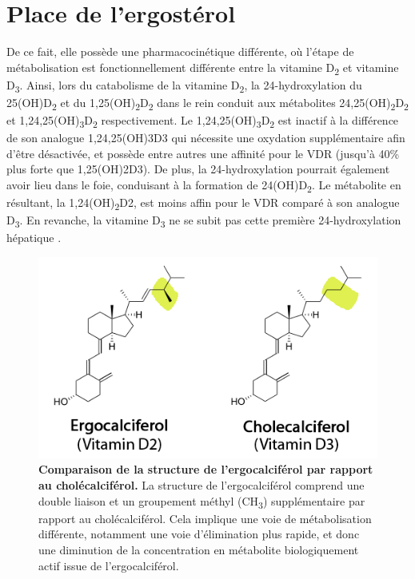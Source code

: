 \documentclass[
  a4paper,
  DIV=11,
  numbers=noendperiod,
  listof=totoc]{scrreprt}
\begin{document}
\hypertarget{place-de-lergostuxe9rol}{%
\section{Place de l'ergostérol}\label{place-de-lergostuxe9rol}}

De ce fait, elle possède une pharmacocinétique différente, où l'étape de
métabolisation est fonctionnellement différente entre la vitamine
D\textsubscript{2} et vitamine D\textsubscript{3}. Ainsi, lors du
catabolisme de la vitamine D\textsubscript{2}, la 24-hydroxylation du
25(OH)D\textsubscript{2} et du
1,25(OH)\textsubscript{2}D\textsubscript{2} dans le rein conduit aux
métabolites 24,25(OH)\textsubscript{2}D\textsubscript{2} et
1,24,25(OH)\textsubscript{3}D\textsubscript{2} respectivement. Le
1,24,25(OH)\textsubscript{3}D\textsubscript{2} est inactif à la
différence de son analogue \ac{1,24,25(OH)3D3} qui nécessite une
oxydation supplémentaire afin d'être désactivée, et possède entre autres
une affinité pour le \ac{VDR} (jusqu'à 40\% plus forte que
\ac{1,25(OH)2D3}). De plus, la 24-hydroxylation pourrait également avoir
lieu dans le foie, conduisant à la formation de
24(OH)D\textsubscript{2}. Le métabolite en résultant, la
1,24(OH)\textsubscript{2}D2, est moins affin pour le \ac{VDR} comparé à
son analogue D\textsubscript{3}. En revanche, la vitamine
D\textsubscript{3} ne se subit pas cette première 24-hydroxylation
hépatique \autocite{Houghton.2006}.

\begin{figure}
\includegraphics{figures/ergo_vs_chole.png} 
\caption[\textbf{Comparaison de la structure de l'ergocalciférol par rapport au cholécalciférol.}]{\textbf{Comparaison de la structure de l'ergocalciférol par rapport au cholécalciférol.} La structure de l'ergocalciférol comprend une double liaison et un groupement méthyl (CH\textsubscript{3}) supplémentaire par rapport au cholécalciférol. Cela implique une voie de métabolisation différente, notamment une voie d'élimination plus rapide, et donc une diminution de la concentration en métabolite biologiquement actif issue de l'ergocalciférol. \cite{Houghton.2006}}
\label{fig:ergo-struc}
\end{figure}
\end{document}
